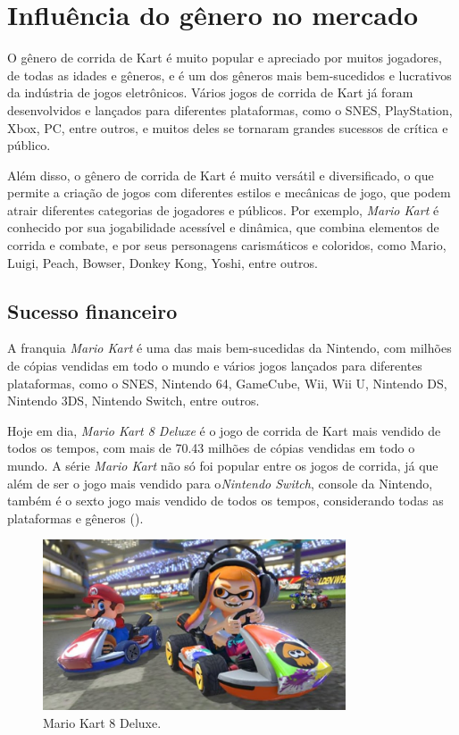\section{Influência do gênero no mercado}

O gênero de corrida de Kart é muito popular e apreciado por muitos jogadores, de todas as idades e gêneros, e é um dos gêneros mais bem-sucedidos e lucrativos da indústria de jogos eletrônicos. Vários jogos de corrida de Kart já foram desenvolvidos e lançados para diferentes plataformas, como o SNES, PlayStation, Xbox, PC, entre outros, e muitos deles se tornaram grandes sucessos de crítica e público.

Além disso, o gênero de corrida de Kart é muito versátil e diversificado, o que permite a criação de jogos com diferentes estilos e mecânicas de jogo, que podem atrair diferentes categorias de jogadores e públicos. Por exemplo, \textit{Mario Kart} é conhecido por sua jogabilidade acessível e dinâmica, que combina elementos de corrida e combate, e por seus personagens carismáticos e coloridos, como Mario, Luigi, Peach, Bowser, Donkey Kong, Yoshi, entre outros.

\subsection{Sucesso financeiro}

A franquia \textit{Mario Kart} é uma das mais bem-sucedidas da Nintendo, com milhões de cópias vendidas em todo o mundo e vários jogos lançados para diferentes plataformas, como o SNES, Nintendo 64, GameCube, Wii, Wii U, Nintendo DS, Nintendo 3DS, Nintendo Switch, entre outros.

Hoje em dia, \textit{Mario Kart 8 Deluxe} é o jogo de corrida de Kart mais vendido de todos os tempos, com mais de 70.43 milhões de cópias vendidas em todo o mundo. A série \textit{Mario Kart} não só foi popular entre os jogos de corrida, já que além de ser o jogo mais vendido para o\textit{Nintendo Switch}, console da Nintendo, também é o sexto jogo mais vendido de todos os tempos, considerando todas as plataformas e gêneros (\cite{bestSellingGames}).

\begin{figure}[H]
    \centering
    \includegraphics[width=0.8\textwidth]{figuras/Mario Kart 8.jpg}
    \caption{Mario Kart 8 Deluxe. \cite{marioKart8}}
    \label{fig:mario-kart-8-deluxe}
\end{figure}

